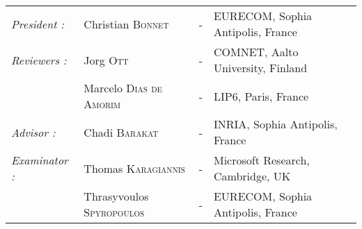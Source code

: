 \begin{titlepage}
\begin{center}
\begin{tabular}{llcl}
\textit{President :}	& Christian \textsc{Bonnet}		& - & EURECOM, Sophia Antipolis, France\\
      \textit{Reviewers :}	& Jorg \textsc{Ott}	& - & COMNET, Aalto University, Finland\\
                        	& Marcelo \textsc{Dias de Amorim}		& - & LIP6, Paris, France\\
      \textit{Advisor :}	& Chadi \textsc{Barakat}	& - & INRIA, Sophia Antipolis, France\\
           \textit{Examinator :}  & Thomas \textsc{Karagiannis} & - & Microsoft Research, Cambridge, UK\\
                                 & Thrasyvoulos \textsc{Spyropoulos}	& - & EURECOM, Sophia Antipolis, France \\
\end{tabular}
\end{center}
\end{titlepage}
\sloppy

\titlepage
